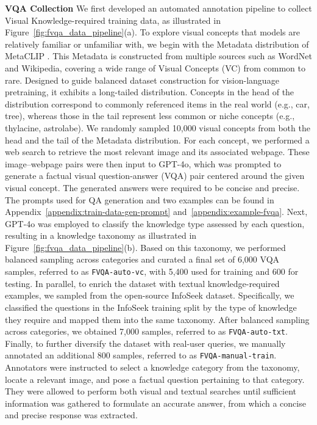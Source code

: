 \documentclass{article}
\begin{document}
\textbf{VQA Collection} We first developed an automated annotation pipeline to collect Visual Knowledge-required training data, as illustrated in Figure~\ref{fig:fvqa_data_pipeline}(a). To explore visual concepts that models are relatively familiar or unfamiliar with, we begin with the Metadata distribution of MetaCLIP \cite{dataset/metaclip}. This Metadata is constructed from multiple sources such as WordNet and Wikipedia, covering a wide range of Visual Concepts (VC) from common to rare. Designed to guide balanced dataset construction for vision-language pretraining, it exhibits a long-tailed distribution. Concepts in the head of the distribution correspond to commonly referenced items in the real world (e.g., car, tree), whereas those in the tail represent less common or niche concepts (e.g., thylacine, astrolabe). We randomly sampled 10,000 visual concepts from both the head and the tail of the Metadata distribution. For each concept, we performed a web search to retrieve the most relevant image and its associated webpage. These image–webpage pairs were then input to GPT-4o, which was prompted to generate a factual visual question-answer (VQA) pair centered around the given visual concept. The generated answers were required to be concise and precise.
The prompts used for QA generation and two examples can be found in Appendix~\ref{appendix:train-data-gen-prompt} and~\ref{appendix:example-fvqa}.
Next, GPT-4o was employed to classify the knowledge type assessed by each question, resulting in a knowledge taxonomy as illustrated in Figure~\ref{fig:fvqa_data_pipeline}(b). Based on this taxonomy, we performed balanced sampling across categories and curated a final set of 6,000 VQA samples, referred to as \texttt{FVQA-auto-vc}, with 5,400 used for training and 600 for testing. In parallel, to enrich the dataset with textual knowledge-required examples, we sampled from the open-source InfoSeek \cite{dataset/infoseek} dataset. Specifically, we classified the questions in the InfoSeek training split by the type of knowledge they require and mapped them into the same taxonomy. After balanced sampling across categories, we obtained 7,000 samples, referred to as \texttt{FVQA-auto-txt}. Finally, to further diversify the dataset with real-user queries, we manually annotated an additional 800 samples, referred to as \texttt{FVQA-manual-train}. Annotators were instructed to select a knowledge category from the taxonomy, locate a relevant image, and pose a factual question pertaining to that category. They were allowed to perform both visual and textual searches until sufficient information was gathered to formulate an accurate answer, from which a concise and precise response was extracted.
\end{document}
